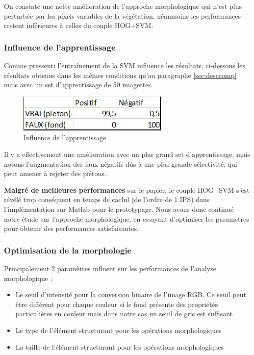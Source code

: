 \documentclass{article}
\begin{document}
	On constate une nette amélioration de l'approche morphologique qui n'est plus perturbée par les pixels variables de la végétation, néanmoins les performances restent inférieures à celles du couple HOG+SVM.
	
	\subsubsection{Influence de l'apprentissage}
	Comme pressenti l'entraînement de la SVM influence les résultats, ci-dessous les résultats obtenus dans les mêmes conditions qu'au paragraphe \ref{sec:desccomp} mais avec un set d'apprentissage de 50 imagettes.
	
	\begin{figure}[h]
		\begin{center}			
			\includegraphics[scale=0.5]{Img/MATCONFHOGtest2}
		\end{center}
		\caption{Influence de l'apprentissage}
	\end{figure}
	Il y a effectivement une amélioration avec un plus grand set d'apprentissage, mais notons l'augmentation des faux négatifs dûs à une plus grande sélectivité, qui peut amener à rejeter des piétons.
	
		\begin{shaded}
			\textbf{Malgré de meilleures performances} sur le papier, le couple HOG+SVM s'est révélé trop conséquent en temps de caclul (de l'ordre de 1 IPS) dans l'implémentation sur Matlab pour le prototypage. Nous avons donc continué notre étude sur l'approche morphologique, en essayant d'optimiser les paramètres pour obtenir des performances satisfaisantes.
		\end{shaded}

	\subsubsection{Optimisation de la morphologie}
	Principalement 2 paramètres influent sur les performances de l'analyse morphologique :
	\begin{itemize}
		\item Le seuil d'intensité pour la conversion binaire de l'image RGB. Ce seuil peut être différent pour chaque couleur si le fond présente des propriétés particulières en couleur mais dans notre cas un seuil de gris est suffisant.
		\item Le type de l'élément structurant pour les opérations morphologiques
		\item La taille de l'élément structurant pour les opérations morphologiques
	\end{itemize}
\end{document}
